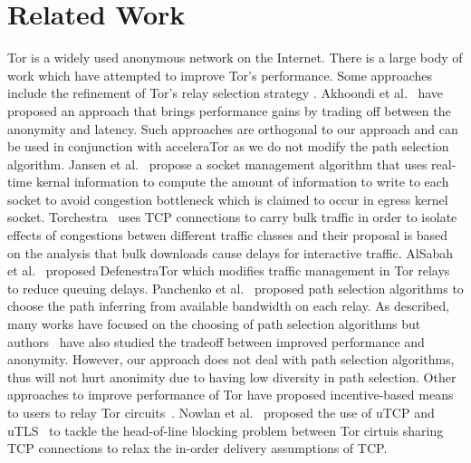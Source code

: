 \section{Related Work}
\label{sec:re-work}
Tor is a widely used anonymous network on the Internet. There is a large body of work which have attempted to improve Tor’s performance. Some approaches include the refinement of Tor’s relay selection strategy \cite{6679287, Sherr10a3:an, Snader08atune-up}. Akhoondi et al.~\cite{6679287} have proposed an approach that brings performance gains by trading off between the anonymity and latency. Such approaches are orthogonal to our approach and can be used in conjunction with acceleraTor as we do not modify the path selection algorithm.
Jansen et al.~\cite{184431} propose a socket management algorithm that uses real-time kernal information to compute the amount of information to write to each socket to avoid congestion bottleneck which is claimed to occur in egress kernel socket.
Torchestra~\cite{Gopal:2012:TRI:2381966.2381972} uses TCP connections to carry bulk traffic in order to isolate effects of congestions betwen different traffic classes and their proposal is based on the analysis that bulk downloads cause delays for interactive traffic. 
AlSabah et al.~\cite{AlSabah:2011:DTO:2032162.2032170} proposed DefenestraTor which modifies traffic management in Tor relays to reduce queuing delays. Panchenko et al.~\cite{5230652} proposed path selection algorithms to choose the path inferring from available bandwidth on each relay.  
As described, many works have focused on the choosing of path selection algorithms but authors~\cite{Panchenko:2008:PAA:1371602.1371906} have also studied the tradeoff between improved performance and anonymity. However, our approach does not deal with path selection algorithms, thus will not hurt anonimity due to having low diversity in path selection. Other approaches to improve performance of Tor have proposed  incentive-based means to users to relay Tor circuits~\cite{Jansen:2010:RNT:1866307.1866344, Jansen_lira:lightweight}. Nowlan et al.~\cite{179191} proposed the use of uTCP and uTLS~\cite{180706} to tackle the head-of-line blocking problem between Tor cirtuis sharing TCP connections to relax the in-order delivery assumptions of TCP. 

